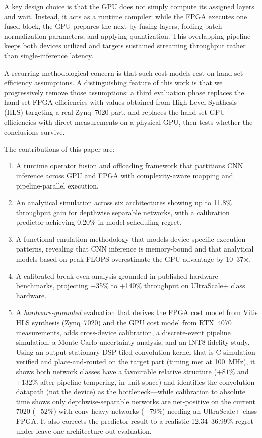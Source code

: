 \documentclass[runningheads]{llncs}
\begin{document}
A key design choice is that the GPU does not simply compute its assigned layers and wait. Instead, it acts as a runtime compiler: while the FPGA executes one fused block, the GPU prepares the next by fusing layers, folding batch normalization parameters, and applying quantization. This overlapping pipeline keeps both devices utilized and targets sustained streaming throughput rather than single-inference latency.

A recurring methodological concern is that such cost models rest on hand-set efficiency assumptions. A distinguishing feature of this work is that we progressively remove those assumptions: a third evaluation phase replaces the hand-set FPGA efficiencies with values obtained from High-Level Synthesis (HLS) targeting a real Zynq~7020 part, and replaces the hand-set GPU efficiencies with direct measurements on a physical GPU, then tests whether the conclusions survive.

The contributions of this paper are:

\begin{enumerate}
    \item A runtime operator fusion and offloading framework that partitions CNN inference across GPU and FPGA with complexity-aware mapping and pipeline-parallel execution.
    \item An analytical simulation across six architectures showing up to 11.8\% throughput gain for depthwise separable networks, with a calibration predictor achieving 0.20\% in-model scheduling regret.
    \item A functional emulation methodology that models device-specific execution patterns, revealing that CNN inference is memory-bound and that analytical models based on peak FLOPS overestimate the GPU advantage by 10--37$\times$.
    \item A calibrated break-even analysis grounded in published hardware benchmarks, projecting +35\% to +140\% throughput on UltraScale+ class hardware.
    \item A \emph{hardware-grounded} evaluation that derives the FPGA cost model from Vitis HLS synthesis (Zynq~7020) and the GPU cost model from RTX~4070 measurements, adds cross-device calibration, a discrete-event pipeline simulation, a Monte-Carlo uncertainty analysis, and an INT8 fidelity study. Using an output-stationary DSP-tiled convolution kernel that is C-simulation-verified and place-and-routed on the target part (timing met at 100~MHz), it shows both network classes have a favourable relative structure ($+81\%$ and $+132\%$ after pipeline tempering, in unit space) and identifies the convolution datapath (not the device) as the bottleneck---while calibration to absolute time shows only depthwise-separable networks are net-positive on the current 7020 ($+52\%$) with conv-heavy networks ($-79\%$) needing an UltraScale+-class FPGA. It also corrects the predictor result to a realistic 12.34--36.99\% regret under leave-one-architecture-out evaluation.
\end{enumerate}
\end{document}
